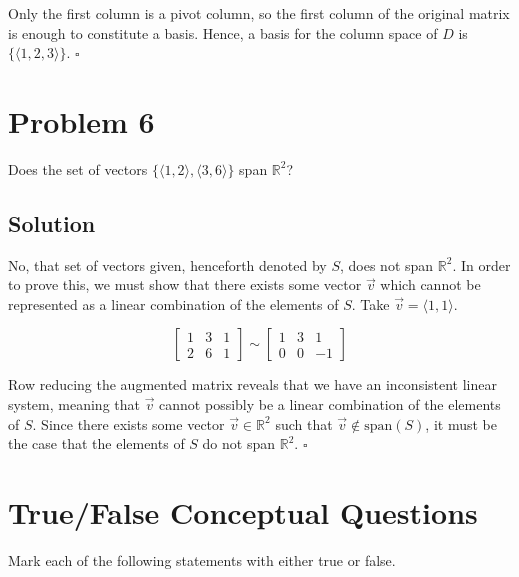 \documentclass{zupan}
\begin{document}
Only the first column is a pivot column, so the first column of the original
matrix is enough to constitute a basis. Hence, a basis for the column space of
\(D\) is \(\{\langle 1, 2, 3 \rangle\}\). \(\square\)

\section*{Problem 6}

Does the set of vectors \(\{\langle 1, 2 \rangle, \langle 3, 6 \rangle\}\) span
\(\mathbb{R}^2\)?

\subsection*{Solution}

No, that set of vectors given, henceforth denoted by \(S\), does not span
\(\mathbb{R}^2\). In order to prove this, we must show that there exists some
vector \(\vec{v}\) which cannot be represented as a linear combination of the
elements of \(S\). Take \(\vec{v} = \langle 1, 1 \rangle\).

\[
  \begin{bmatrix}
    1 & 3 & 1 \\
    2 & 6 & 1
  \end{bmatrix}
  \sim \begin{bmatrix}
    1 & 3 & 1 \\
    0 & 0 & -1
  \end{bmatrix}
\]

Row reducing the augmented matrix reveals that we have an inconsistent linear
system, meaning that \(\vec{v}\) cannot possibly be a linear combination of the
elements of \(S\). Since there exists some vector \(\vec{v} \in \mathbb{R}^2\)
such that \(\vec{v} \notin \text{span}(S)\), it must be the case that the
elements of \(S\) do not span \(\mathbb{R}^2\). \(\square\)

\section*{True/False Conceptual Questions}

Mark each of the following statements with either true or false.
\end{document}
